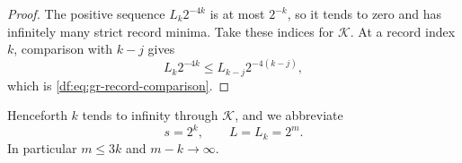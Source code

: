 \begin{proof}
The positive sequence $L_k2^{-4k}$ is at most $2^{-k}$, so it tends to
zero and has infinitely many strict record minima. Take these indices
for $\mathcal K$. At a record index $k$, comparison with $k-j$ gives
\[
 L_k2^{-4k}\leq L_{k-j}2^{-4(k-j)},
\]
which is \eqref{df:eq:gr-record-comparison}.
\end{proof}

Henceforth $k$ tends to infinity through $\mathcal K$, and we abbreviate
\[
 s=2^k,\qquad L=L_k=2^m.
\]
In particular $m\leq3k$ and $m-k\to\infty$.

